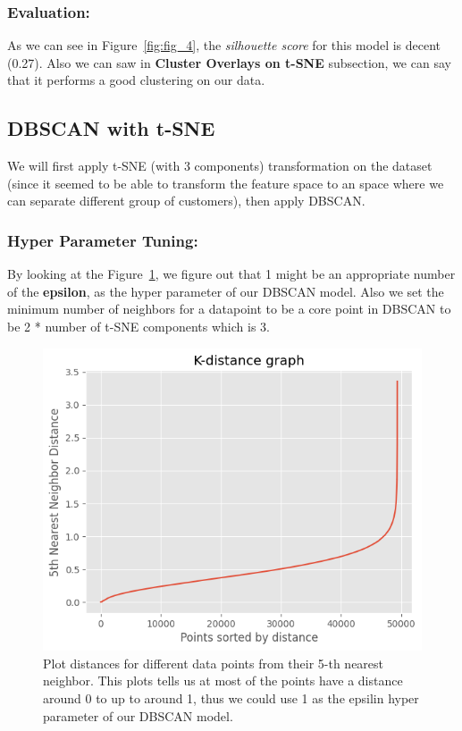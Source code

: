 \documentclass[a4paper,12pt]{article}
\begin{document}
\subsubsection{Evaluation:}
As we can see in Figure~\ref{fig:fig_4}, the \textit{silhouette score} for this model is decent (0.27). 
Also we can saw in \textbf{Cluster Overlays on t-SNE} subsection, we can say that it performs a good clustering on our data.



\subsection{DBSCAN with t-SNE}
We will first apply t-SNE (with 3 components) transformation on the dataset (since it seemed to be able to transform the feature space to an space where we can separate different group of customers), then apply DBSCAN.

\subsubsection{Hyper Parameter Tuning:}
By looking at the Figure~\ref{fig:fig_7}, we figure out that 1 might be an appropriate number of the \textbf{epsilon}, as the hyper parameter of our DBSCAN model. 
Also we set the minimum number of neighbors for a datapoint to be a core point in DBSCAN to be 2 * number of t-SNE components which is 3.

\begin{figure}[H]
    \centering
    \includegraphics[width=1\textwidth]{./images/parameter_tuning_dbscan.png}
    \caption{Plot distances for different data points from their 5-th nearest neighbor. This plots tells us at most of the points have a distance around 0 to up to around 1, 
    thus we could use 1 as the epsilin hyper parameter of our DBSCAN model.}
    \label{fig:fig_7}
\end{figure}
\end{document}
